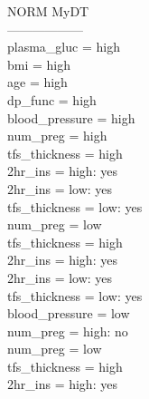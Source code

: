 \documentclass[12pt]{article}
\begin{document}
NORM MyDT \\
------------------ \\
plasma\_gluc = high\\
\textbar\quad bmi = high\\
\textbar\quad \textbar\quad age = high\\
\textbar\quad \textbar\quad \textbar\quad dp\_func = high\\
\textbar\quad \textbar\quad \textbar\quad \textbar\quad blood\_pressure = high\\
\textbar\quad \textbar\quad \textbar\quad \textbar\quad \textbar\quad num\_preg = high\\
\textbar\quad \textbar\quad \textbar\quad \textbar\quad \textbar\quad \textbar\quad tfs\_thickness = high\\
\textbar\quad \textbar\quad \textbar\quad \textbar\quad \textbar\quad \textbar\quad \textbar\quad 2hr\_ins = high: yes\\
\textbar\quad \textbar\quad \textbar\quad \textbar\quad \textbar\quad \textbar\quad \textbar\quad 2hr\_ins = low: yes\\
\textbar\quad \textbar\quad \textbar\quad \textbar\quad \textbar\quad \textbar\quad tfs\_thickness = low: yes\\
\textbar\quad \textbar\quad \textbar\quad \textbar\quad \textbar\quad num\_preg = low\\
\textbar\quad \textbar\quad \textbar\quad \textbar\quad \textbar\quad \textbar\quad tfs\_thickness = high\\
\textbar\quad \textbar\quad \textbar\quad \textbar\quad \textbar\quad \textbar\quad \textbar\quad 2hr\_ins = high: yes\\
\textbar\quad \textbar\quad \textbar\quad \textbar\quad \textbar\quad \textbar\quad \textbar\quad 2hr\_ins = low: yes\\
\textbar\quad \textbar\quad \textbar\quad \textbar\quad \textbar\quad \textbar\quad tfs\_thickness = low: yes\\
\textbar\quad \textbar\quad \textbar\quad \textbar\quad blood\_pressure = low\\
\textbar\quad \textbar\quad \textbar\quad \textbar\quad \textbar\quad num\_preg = high: no\\
\textbar\quad \textbar\quad \textbar\quad \textbar\quad \textbar\quad num\_preg = low\\
\textbar\quad \textbar\quad \textbar\quad \textbar\quad \textbar\quad \textbar\quad tfs\_thickness = high\\
\textbar\quad \textbar\quad \textbar\quad \textbar\quad \textbar\quad \textbar\quad \textbar\quad 2hr\_ins = high: yes\\
\end{document}
